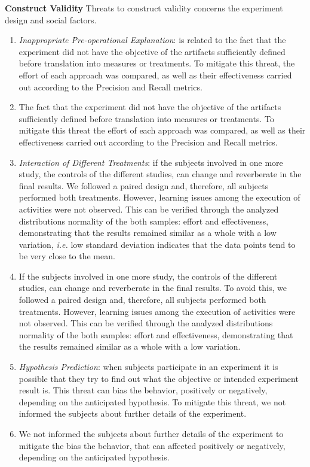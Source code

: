 \textbf{Construct Validity}
Threats to construct validity concerns the experiment design and social factors.
\begin{enumerate}[label=\roman*]
    \item \textit{Inappropriate Pre-operational Explanation}:  is related to the fact that the experiment did not have the objective of the artifacts sufficiently defined before translation into measures or treatments. To mitigate this threat, the effort of each approach was compared, as well as their effectiveness carried out according to the Precision and Recall metrics. 
    \item The fact that the experiment did not have the objective of the artifacts sufficiently defined before translation into measures or treatments. To mitigate this threat the effort of each approach was compared, as well as their effectiveness carried out according to the Precision and Recall metrics. 
    \item \textit{Interaction of Different Treatments}: 
    if the subjects involved in one more study, the controls of the different studies, can change and reverberate in the final results.
    We followed a paired design and, therefore, all subjects performed both treatments.
    However, learning issues among the execution of activities were not observed.
    This can be verified through the analyzed distributions normality of the both samples: effort and effectiveness, demonstrating that the results remained similar as a whole with a low variation, \textit{i.e.} low standard deviation indicates that the data points tend to be very close to the mean. 
    \item If the subjects involved in one more study, the controls of the different studies, can change and reverberate in the final results. To avoid this, we followed a paired design and, therefore, all subjects performed both treatments. However, learning issues among the execution of activities were not observed. This can be verified through the analyzed distributions normality of the both samples: effort and effectiveness, demonstrating that the results remained similar as a whole with a low variation.
    \item \textit{Hypothesis Prediction}: 
    when subjects participate in an experiment it is possible that they try to find out what the objective or intended experiment result is. 
    This threat can bias the behavior, positively or negatively, depending on the anticipated hypothesis.
    To mitigate this threat, we not informed the subjects about further details of the experiment.
    \item We not informed the subjects about further details of the experiment to mitigate the bias the behavior, that can affected positively or negatively, depending on the anticipated hypothesis.
\end{enumerate}

